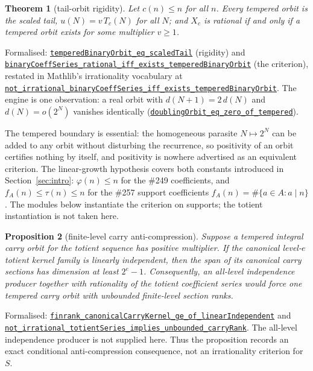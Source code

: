 \documentclass[11pt]{article}
\newcommand{\commit}{81150c1c6fdd4cd51e76d3aa0de344341e0e9e7c}
\newcommand{\repobase}{https://github.com/wcook04/plectis-lean-erdos249-257/blob/\commit}
\newcommand{\PK}{Erdos249257}
\newcommand{\lref}[3]{\href{\repobase/\PK/#1\#L#2}{\nolinkurl{#3}}}
\newcommand{\lrefx}[3]{\href{\repobase/\PK/#1\#L#2}{\nolinkurl{#3}}}
\newtheorem{theorem}{Theorem}[section]
\newtheorem{proposition}[theorem]{Proposition}
\theoremstyle{definition}
\theoremstyle{remark}
\newcommand{\ph}{\varphi}
\begin{document}
\begin{theorem}[tail-orbit rigidity]\label{res:rigidity}
Let $c(n)\le n$ for all $n$. Every tempered orbit is the scaled tail,
$u(N)=v\,T_c(N)$ for all $N$; and $X_c$ is rational if and only if a tempered
orbit exists for some multiplier $v\ge1$.
\end{theorem}
\noindent Formalised:
\lref{GenericTailOrbitRigidity.lean}{338}{temperedBinaryOrbit_eq_scaledTail}
(rigidity) and
\lref{GenericTailOrbitRigidity.lean}{425}{binaryCoeffSeries_rational_iff_exists_temperedBinaryOrbit}
(the criterion), restated in Mathlib's irrationality vocabulary at
\lrefx{GenericTailOrbitRigidity.lean}{434}{not_irrational_binaryCoeffSeries_iff_exists_temperedBinaryOrbit}.
The engine is one observation: a real orbit with $d(N+1)=2\,d(N)$ and
$d(N)=o(2^N)$ vanishes identically
(\lrefx{GenericTailOrbitRigidity.lean}{314}{doublingOrbit_eq_zero_of_tempered}).

The tempered boundary is essential: the
homogeneous parasite $N\mapsto2^N$ can be added to any orbit without
disturbing the recurrence, so positivity of an orbit certifies nothing by
itself, and positivity is nowhere advertised as an equivalent criterion. The
linear-growth hypothesis covers both constants introduced in
Section~\ref{sec:intro}:
$\ph(n)\le n$ for the \#249 coefficients, and $f_A(n)\le\tau(n)\le n$ for the
\#257 support coefficients $f_A(n)=\#\{a\in A:a\mid n\}$. The modules below
instantiate the criterion on supports; the totient instantiation is not taken
here.

\begin{proposition}[finite-level carry anti-compression]\label{res:carryrank}
Suppose a tempered integral carry orbit for the totient sequence has positive
multiplier.  If the canonical level-$e$ totient kernel family is linearly
independent, then the span of its canonical carry sections has dimension at
least $2^e-1$.  Consequently, an all-level independence producer together
with rationality of the totient coefficient series would force one tempered
carry orbit with unbounded finite-level section ranks.
\end{proposition}
\noindent Formalised:
\lref{TotientCarryKernelRigidity.lean}{211}{finrank_canonicalCarryKernel_ge_of_linearIndependent}
and
\lref{TotientCarryKernelRigidity.lean}{261}{not_irrational_totientSeries_implies_unbounded_carryRank}.
The all-level independence producer is not supplied here.  Thus the
proposition records an exact conditional anti-compression consequence, not an
irrationality criterion for $S$.
\end{document}
